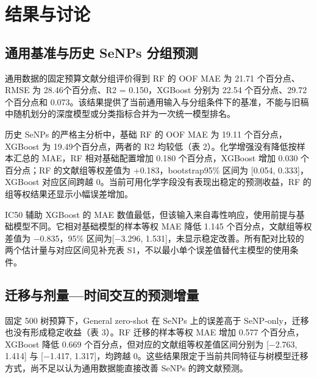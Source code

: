 \section{结果与讨论}

\subsection{通用基准与历史 SeNPs 分组预测}

通用数据的固定预算文献分组评价得到 RF 的 OOF MAE 为 21.71 个百分点、RMSE 为 28.46个百分点、R2 = 0.150，XGBoost 分别为 22.54 个百分点、29.72 个百分点和 0.073。该结果提供了当前通用输入与分组条件下的基准，不能与旧稿中随机划分的深度模型或分类指标合并为一次统一模型排名。

历史 SeNPs 的严格主分析中，基础 RF 的 OOF MAE 为 19.11 个百分点，XGBoost 为 19.49个百分点，两者的 R2 均较低（表 2）。化学增强没有降低按样本汇总的 MAE，RF 相对基础配置增加 0.180 个百分点，XGBoost 增加 0.030 个百分点；RF 的文献组等权差值为 +0.183，bootstrap95\% 区间为 [0.054, 0.333]，XGBoost 对应区间跨越 0。当前可用化学字段没有表现出稳定的预测收益，RF 的组等权结果还显示小幅误差增加。

\begin{table}[H]
\centering
\caption{434 条历史 SeNPs 记录的 5 折外层、3 折内层文献分组评价。指标由外层 OOF 预测计算，IC50 辅助配置单列。}
\label{tab:senp_main_results}
\small

\end{table}

IC50 辅助 XGBoost 的 MAE 数值最低，但该输入来自毒性响应，使用前提与基础模型不同。它相对基础模型的样本等权 MAE 降低 1.145 个百分点，文献组等权差值为 \ensuremath{\mathord{-}}0.835，95\% 区间为[\ensuremath{\mathord{-}}3.296, 1.531]，未显示稳定改善。所有配对比较的两个估计量与对应区间见补充表 S1，不以最小单个误差值替代主模型的使用条件。

\subsection{迁移与剂量—时间交互的预测增量}

固定 500 树预算下，General zero-shot 在 SeNPs 上的误差高于 SeNP-only，迁移也没有形成稳定收益（表 3）。RF 迁移的样本等权 MAE 增加 0.577 个百分点，XGBoost 降低 0.669 个百分点，但对应的文献组等权差值区间分别为 [\ensuremath{\mathord{-}}2.763, 1.414] 与 [\ensuremath{\mathord{-}}1.417, 1.317]，均跨越 0。这些结果限定于当前共同特征与树模型迁移方式，尚不足以认为通用数据能直接改善 SeNPs 的跨文献预测。

